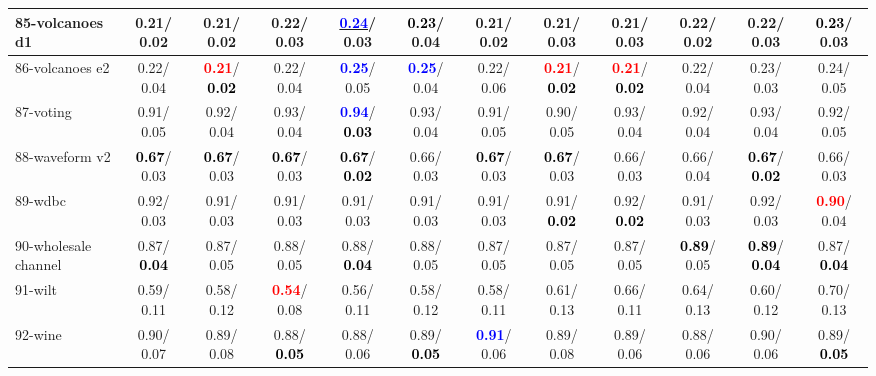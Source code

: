 \begin{table}[h]
\begin{center}
{\begin{tabular}{lc|c|c|c|c|c|c|c|c|c|c}
85-volcanoes d1 &   0.21/  0.02 &   0.21/  0.02 &   0.22/  0.03 & \underline{\textcolor{blue}{\textbf{  0.24}}}/  0.03 & \textcolor{black}{\textbf{  0.23}}/  0.04 &   0.21/  0.02 &   0.21/  0.03 &   0.21/  0.03 &   0.22/  0.02 &   0.22/  0.03 & \textcolor{black}{\textbf{  0.23}}/  0.03 \\ \hline
86-volcanoes e2 &   0.22/  0.04 & \textcolor{red}{\textbf{  0.21}}/\textcolor{black}{\textbf{  0.02}} &   0.22/  0.04 & \textcolor{blue}{\textbf{  0.25}}/  0.05 & \textcolor{blue}{\textbf{  0.25}}/  0.04 &   0.22/  0.06 & \textcolor{red}{\textbf{  0.21}}/\textcolor{black}{\textbf{  0.02}} & \textcolor{red}{\textbf{  0.21}}/\textcolor{black}{\textbf{  0.02}} &   0.22/  0.04 &   0.23/  0.03 &   0.24/  0.05 \\
87-voting &   0.91/  0.05 &   0.92/  0.04 &   0.93/  0.04 & \textcolor{blue}{\textbf{  0.94}}/\textcolor{black}{\textbf{  0.03}} &   0.93/  0.04 &   0.91/  0.05 &   0.90/  0.05 &   0.93/  0.04 &   0.92/  0.04 &   0.93/  0.04 &   0.92/  0.05 \\
88-waveform v2 & \textcolor{black}{\textbf{  0.67}}/  0.03 & \textcolor{black}{\textbf{  0.67}}/  0.03 & \textcolor{black}{\textbf{  0.67}}/  0.03 & \textcolor{black}{\textbf{  0.67}}/\textcolor{black}{\textbf{  0.02}} &   0.66/  0.03 & \textcolor{black}{\textbf{  0.67}}/  0.03 & \textcolor{black}{\textbf{  0.67}}/  0.03 &   0.66/  0.03 &   0.66/  0.04 & \textcolor{black}{\textbf{  0.67}}/\textcolor{black}{\textbf{  0.02}} &   0.66/  0.03 \\
89-wdbc &   0.92/  0.03 &   0.91/  0.03 &   0.91/  0.03 &   0.91/  0.03 &   0.91/  0.03 &   0.91/  0.03 &   0.91/\textcolor{black}{\textbf{  0.02}} &   0.92/\textcolor{black}{\textbf{  0.02}} &   0.91/  0.03 &   0.92/  0.03 & \textcolor{red}{\textbf{  0.90}}/  0.04 \\
90-wholesale channel &   0.87/\textcolor{black}{\textbf{  0.04}} &   0.87/  0.05 &   0.88/  0.05 &   0.88/\textcolor{black}{\textbf{  0.04}} &   0.88/  0.05 &   0.87/  0.05 &   0.87/  0.05 &   0.87/  0.05 & \textcolor{black}{\textbf{  0.89}}/  0.05 & \textcolor{black}{\textbf{  0.89}}/\textcolor{black}{\textbf{  0.04}} &   0.87/\textcolor{black}{\textbf{  0.04}} \\
91-wilt &   0.59/  0.11 &   0.58/  0.12 & \textcolor{red}{\textbf{  0.54}}/  0.08 &   0.56/  0.11 &   0.58/  0.12 &   0.58/  0.11 &   0.61/  0.13 &   0.66/  0.11 &   0.64/  0.13 &   0.60/  0.12 &   0.70/  0.13 \\
92-wine &   0.90/  0.07 &   0.89/  0.08 &   0.88/\textcolor{black}{\textbf{  0.05}} &   0.88/  0.06 &   0.89/\textcolor{black}{\textbf{  0.05}} & \textcolor{blue}{\textbf{  0.91}}/  0.06 &   0.89/  0.08 &   0.89/  0.06 &   0.88/  0.06 &   0.90/  0.06 &   0.89/\textcolor{black}{\textbf{  0.05}} \\ \hline

\end{tabular}}
\end{center}
\end{table}
